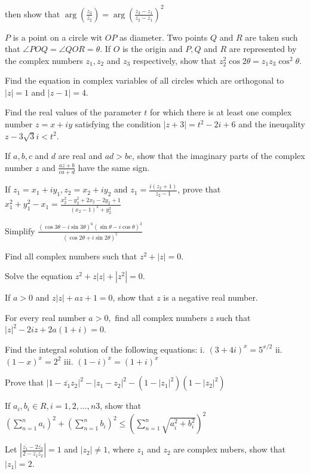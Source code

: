     then show that $\arg\left(\frac{z_3}{z_2}\right) = \arg\left(\frac{z_3 - z_1}{z_2 - z_1}\right)^2$
\item $P$ is a point on a circle wit $OP$ as diameter. Two points $Q$ and $R$ are taken such that $\angle POQ = \angle QOR =
  \theta$. If $O$ is the origin and $P, Q$ and $R$ are represented by the complex numbers $z_1, z_2$ and $z_3$ respectively, show
  that $z_2^2\cos2\theta = z_1z_3\cos^2\theta$.
\item Find the equation in complex variables of all circles which are orthogonal to $|z| = 1$ and $|z - 1| = 4$.
\item Find the real values of the parameter $t$ for which there is at least one complex number $z = x + iy$ satisfying the
  condition $|z + 3| = t^2 - 2i + 6$ and the ineuqality $z - 3\sqrt{3}i < t^2$.
\item If $a, b, c$ and $d$ are real and $ad > bc$, show that the imaginary parts of the complex number $z$ and $\frac{az + b}{ca +
  d}$ have the same sign.
\item If $z_1 = x_1 + iy_1, z_2 = x_2 + iy_2$ and $z_1 = \frac{i(z_2 +1)}{z_2 - 1}$, prove that $x_1^2 + y_1^2 - x_1 = \frac{x_2^2
  - y_2^2 + 2x_2 - 2y_2 + 1}{(x_2 - 1)^2 + y_2^2}$
\item Simplify $\frac{(\cos3\theta - i\sin3\theta)^6(\sin\theta - i\cos\theta)^3}{(\cos2\theta + i\sin2\theta)^5}$
\item Find all complex numbers such that $z^2 + |z| = 0$.
\item Solve the equation $z^2 + z|z| + |z^2| = 0$.
\item If $a > 0$ and $z|z| + az + 1 = 0$, show that $z$ is a negative real number.
\item For every real number $a > 0,$ find all complex numbers $z$ such that $|z|^2 - 2iz + 2a(1 + i) = 0$.
\item Find the integral solution of the following equations: i. $(3 + 4i)^x = 5^{x/2}$ ii. $(1 - x)^x = 2^2 $ iii. $(1 - i)^x = (1 +
  i)^x$
\item Prove that $|1 - \overline{z_1}z_2|^2 - |z_1 - z_2|^2 - (1 - |z_1|^2)(1 - |z_2|^2)$
\item If $a_i, b_i\in R, i = 1, 2, \ldots, n3$, show that $\left(\sum_{n = 1}^na_i\right)^2 + \left(\sum_{n = 1}^nb_i\right)^2 \leq
  \left(\sum_{n = 1}^n\sqrt{a_i^2 + b_i^2}\right)^2$
\item Let $\left|\frac{\overline{z_1} - 2\overline{z_2}}{2 - z_1\overline{z_2}}\right| = 1$ and $|z_2|\neq 1$, where $z_1$ and
  $z_2$ are complex nubers, show that $|z_1| = 2$.
